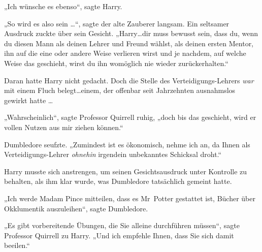 „Ich wünsche es ebenso“, sagte Harry.

„So wird es also sein …“, sagte der alte Zauberer langsam. Ein seltsamer Ausdruck zuckte über sein Gesicht. „Harry…dir muss bewusst sein, dass du, wenn du diesen Mann als deinen Lehrer und Freund wählst, als deinen ersten Mentor, ihn auf die eine oder andere Weise verlieren wirst und je nachdem, auf welche Weise das geschieht, wirst du ihn womöglich nie wieder zurückerhalten.“

Daran hatte Harry nicht gedacht. Doch die Stelle des Verteidigungs-Lehrers \emph{war} mit einem Fluch belegt…einem, der offenbar seit Jahrzehnten ausnahmslos gewirkt hatte …

„Wahrscheinlich“, sagte Professor Quirrell ruhig, „doch bis das geschieht, wird er vollen Nutzen aus mir ziehen können.“

Dumbledore seufzte. „Zumindest ist es ökonomisch, nehme ich an, da Ihnen als Verteidigungs-Lehrer \emph{ohnehin} irgendein unbekanntes Schicksal droht.“

Harry musste sich anstrengen, um seinen Gesichtsausdruck unter Kontrolle zu behalten, als ihm klar wurde, was Dumbledore tatsächlich gemeint hatte.

„Ich werde Madam Pince mitteilen, dass es Mr~Potter gestattet ist, Bücher über Okklumentik auszuleihen“, sagte Dumbledore.

„Es gibt vorbereitende Übungen, die Sie alleine durchführen müssen“, sagte Professor Quirrell zu Harry. „Und ich empfehle Ihnen, dass Sie sich damit beeilen.“

